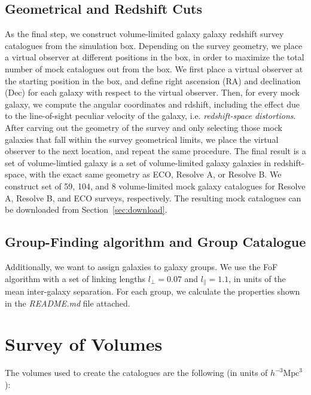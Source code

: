 \documentclass[a4paper, 11pt]{article}
\begin{document}
\subsection{Geometrical and Redshift Cuts}\label{sub:geo_cuts}
As the final step, we construct volume-limited galaxy galaxy redshift 
survey catalogues from the simulation box. Depending on the survey geometry, 
we place a virtual observer at different positions in the box, in order 
to maximize the total number of mock catalogues out from the box. We first 
place a virtual observer at the starting position in the box, and define 
right ascension (RA) and declination (Dec) for each galaxy with respect 
to the virtual observer. Then, for every mock galaxy, we compute the 
angular coordinates and rdshift, including the effect due to the line-of-sight 
peculiar velocity of the galaxy, i.e. \textit{redshift-space distortions}.
After carving out the geometry of the survey and only selecting those 
mock galaxies that fall within the survey geometrical limits, we 
place the virtual observer to the next location, and repeat the same procedure.
The final result is a set of volume-limtied galaxy is a set of volume-limited 
galaxy galaxies in redshift-space, with the exact same geometry as 
ECO, Resolve A, or Resolve B. We construct set of 59, 104, and 8 volume-limited 
mock galaxy catalogues for Resolve A, Resolve B, and ECO surveys, respectively.
The resulting mock catalogues can be downloaded from Section~\ref{sec:download}.

\subsection{Group-Finding algorithm and Group Catalogue}\label{sec:alg_sec}
Additionally, we want to assign galaxies to galaxy groups. We use the 
\citet{Berlind2006} FoF algorithm with a set of linking lengths 
$l_{\perp} = 0.07$ and $l_{\parallel} = 1.1$, in units of the mean 
inter-galaxy separation. For each group, we calculate the properties shown 
in the \textit{README.md} file attached.

\section{Survey of Volumes}\label{sec:volumes}

The volumes used to create the catalogues are the following (in units of 
$h^{-3}\textrm{Mpc}^{3}$  ):\\[10pt]
\end{document}
